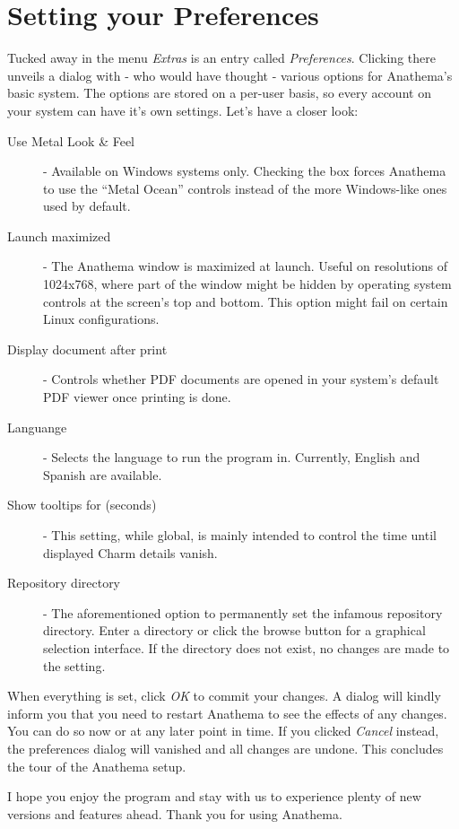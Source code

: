 \section{Setting your Preferences}\label{sec:Preferences}
Tucked away in the menu \emph{Extras} is an entry called \emph{Preferences}. Clicking there unveils a dialog with - who would have thought - various options for Anathema's basic system. The options are stored on a per-user basis, so every account on your system can have it's own settings. Let's have a closer look:
\begin{description}
	\item[Use Metal Look \& Feel] - Available on Windows systems only. Checking the box forces Anathema to use the ``Metal Ocean'' controls instead of the more Windows-like ones used by default.
	\item[Launch maximized] - The Anathema window is maximized at launch. Useful on resolutions of 1024x768, where part of the window might be hidden by operating system controls at the screen's top and bottom. This option might fail on certain Linux configurations.
	\item[Display document after print] - Controls whether PDF documents are opened in your system's default PDF viewer once printing is done.
	\item[Languange] - Selects the language to run the program in. Currently, English and Spanish are available.
	\item[Show tooltips for (seconds)] - This setting, while global, is mainly intended to control the time until displayed Charm details vanish. 
	\item[Repository directory] - The aforementioned option to permanently set the infamous repository directory. Enter a directory or click the browse button for a graphical selection interface. If the directory does not exist, no changes are made to the setting.
\end{description}
	
When everything is set, click \emph{OK} to commit your changes. A dialog will kindly inform you that you need to restart Anathema to see the effects of any changes. You can do so now or at any later point in time. If you clicked \emph{Cancel} instead, the preferences dialog will vanished and all changes are undone.
\medskip
\newline
This concludes the tour of the Anathema setup.

I hope you enjoy the program and stay with us to experience plenty of new versions and features ahead.
\medskip
\newline
Thank you for using Anathema.
